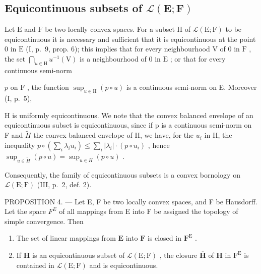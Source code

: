 \subsection{\texorpdfstring{Equicontinuous subsets of \(\mathcal{L}(\mathbf{E};\mathbf{F})\)}{Equicontinuous subsets of \textbackslash mathcal\{L\}(\textbackslash mathbf\{E\};\textbackslash mathbf\{F\})}}

Let \(\mathrm{E}\) and \(\mathrm{F}\) be two locally convex spaces. For a subset \(\mathrm{H}\) of \(\mathcal{L}(\mathrm{E};\mathrm{F})\) to be equicontinuous it is necessary and sufficient that it is equicontinuous at the point 0 in \(\mathrm{E}\) (I, p.~9, prop. 6); this implies that for every neighbourhood \(\mathrm{V}\) of 0 in \(\mathrm{F}\) , the set \(\bigcap_{u\in \mathrm{H}}u^{-1}(\mathrm{V})\) is a neighbourhood of 0 in \(\mathrm{E}\) ; or that for every continuous semi-norm

\(p\) on \(\mathrm{F}\) , the function \(\sup_{u\in \mathrm{H}}(p\circ u)\) is a continuous semi-norm on E. Moreover (I, p.~5),

  H is uniformly equicontinuous. We note that the convex balanced envelope of an equicontinuous subset is equicontinuous, since if p is a continuous semi-norm on F and \(\tilde{H}\) the convex balanced envelope of H, we have, for the \(u_{i}\) in H, the inequality \(p \circ (\sum_{i} \lambda_{i} u_{i}) \leqslant \sum_{i} |\lambda_{i}| \cdot (p \circ u_{i})\) , hence \(\sup_{u \in \tilde{H}} (p \circ u) = \sup_{u \in H} (p \circ u)\) .

Consequently, the family of equicontinuous subsets is a convex bornology on \(\mathcal{L}(\mathrm{E};\mathrm{F})\) (III, p.~2, def. 2).

PROPOSITION 4. --- Let E, F be two locally convex spaces, and F be Hausdorff. Let the space \(F^{E}\) of all mappings from E into F be assigned the topology of simple convergence. Then

\begin{enumerate}
\def\labelenumi{(\roman{enumi})}
\item
  The set of linear mappings from \(\mathbf{E}\) into \(\mathbf{F}\) is closed in \(\mathbf{F}^{\mathrm{E}}\) .
\item
  If \(\mathbf{H}\) is an equicontinuous subset of \(\mathcal{L}(\mathrm{E};\mathrm{F})\) , the closure \(\overline{\mathbf{H}}\) of \(\mathbf{H}\) in \(\mathrm{F}^{\mathrm{E}}\) is contained in \(\mathcal{L}(\mathrm{E};\mathrm{F})\) and is equicontinuous.
\end{enumerate}

